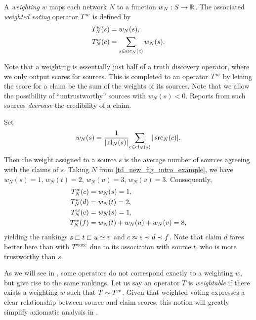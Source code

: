 \begin{definition}
    A \emph{weighting} $w$ maps each network $N$ to a function $w_N: S \to \mathbb{R}$.
    The associated \emph{weighted voting} operator $T^{w}$ is defined by
    \begin{align*}
        T^{w}_N(s) &= w_N(s), \\
        T^{w}_N(c) &= \sum_{s \in \operatorname{src}_N(c)}{w_N(s)}.
    \end{align*}
\end{definition}

Note that a weighting is essentially just half of a truth discovery operator,
where we only output scores for sources. This is completed to an operator
$T^{w}$ by letting the score for a claim be the sum of the weights of its
sources. Note that we allow the possibility of ``untrustworthy'' sources with
$w_N(s) < 0$. Reports from such sources \emph{decrease} the credibility of a
claim.

\begin{example}
    \label{td_new_ex_weighted_voting}
    Set
    \[
        w_N(s) = \frac{1}{|\operatorname{cl}_N(s)|}{
            \sum_{c \in \operatorname{cl}_N(s)}{
                |\operatorname{src}_N(c)|
            }
        }.
    \]
    Then the weight assigned to a source $s$ is the average number of sources
    agreeing with the claims of $s$. Taking $N$ from
    \cref{td_new_fig_intro_example}, we have $w_N(s) = 1$, $w_N(t) = 2$,
    $w_N(u) = 3$, $w_N(v) = 3$.  Consequently,
    \begin{align*}
        T^{w}_N(c) &= w_N(s) = 1,\\
        T^{w}_N(d) &= w_N(t) = 2,\\
        T^{w}_N(e) &= w_N(s) = 1,\\
        T^{w}_N(f) &= w_N(t) + w_N(u) + w_N(v) = 8,
    \end{align*}
    yielding the rankings $s \sqsubset t \sqsubset u \simeq v$ and $c \approx e \prec d \prec
    f$. Note that claim $d$ fares better here than with $T^{\operatorname{vote}}$ due to its
    association with source $t$, who is more trustworthy than $s$.
\end{example}

As we will see in , some operators do not correspond
exactly to a weighting $w$, but give rise to the same rankings. Let us say an
operator $T$ is \emph{weightable} if there exists a weighting $w$ such that $T
\sim T^{w}$. Given that weighted voting expresses a clear
relationship between source and claim scores, this notion will greatly simplify
axiomatic analysis in .

